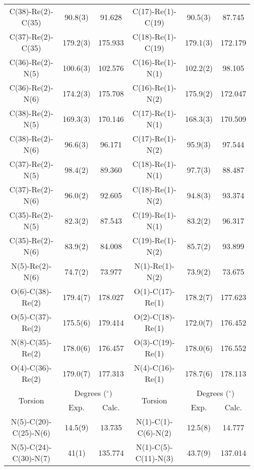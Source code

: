 \begin{table}[htbp]
{\begin{tabular}{cccccc}
    C(38)-Re(2)-C(35) & 90.8(3) & 91.628 & C(17)-Re(1)-C(19) & 90.5(3) & 87.745 \\
    C(37)-Re(2)-C(35) & 179.2(3) & 175.933 & C(18)-Re(1)-C(19) & 179.1(3) & 172.179 \\
    C(36)-Re(2)-N(5) & 100.6(3) & 102.576 & C(16)-Re(1)-N(1) & 102.2(2) & 98.105 \\
    C(36)-Re(2)-N(6) & 174.2(3) & 175.708 & C(16)-Re(1)-N(2) & 175.9(2) & 172.047 \\
    C(38)-Re(2)-N(5) & 169.3(3) & 170.146 & C(17)-Re(1)-N(1) & 168.3(3) & 170.509 \\
    C(38)-Re(2)-N(6) & 96.6(3) & 96.171 & C(17)-Re(1)-N(2) & 95.9(3) & 97.544 \\
    C(37)-Re(2)-N(5) & 98.4(2) & 89.360 & C(18)-Re(1)-N(1) & 97.7(3) & 88.487 \\
    C(37)-Re(2)-N(6) & 96.0(2) & 92.605 & C(18)-Re(1)-N(2) & 94.8(3) & 93.374 \\
    C(35)-Re(2)-N(5) & 82.3(2) & 87.543 & C(19)-Re(1)-N(1) & 83.2(2) & 96.317 \\
    C(35)-Re(2)-N(6) & 83.9(2) & 84.008 & C(19)-Re(1)-N(2) & 85.7(2) & 93.899 \\
    N(5)-Re(2)-N(6) & 74.7(2) & 73.977 & N(1)-Re(1)-N(2) & 73.9(2) & 73.675 \\
    O(6)-C(38)-Re(2) & 179.4(7) & 178.027 & O(1)-C(17)-Re(1) & 178.2(7) & 177.623 \\
    O(5)-C(37)-Re(2) & 175.5(6) & 179.414 & O(2)-C(18)-Re(1) & 172.0(7) & 176.452 \\ 
    N(8)-C(35)-Re(2) & 178.0(6) & 176.457 & O(3)-C(19)-Re(1) & 178.0(6) & 176.552 \\
    O(4)-C(36)-Re(2) & 179.0(7) & 177.313 & N(4)-C(16)-Re(1) & 178.7(6) & 178.113 \\ \midrule
    \multirow{2}{*}{Torsion} & \multicolumn{2}{c}{Degrees ($^\circ$)} & \multirow{2}{*}{Torsion} & \multicolumn{2}{c}{Degrees ($^\circ$)} \\ \cline{2-3} \cline {5-6}
     & Exp. & Calc. & & Exp. & Calc. \\ \midrule
    N(5)-C(20)-C(25)-N(6) & 14.5(9) & 13.735 & N(1)-C(1)-C(6)-N(2) & 12.5(8) & 14.777 \\
    N(5)-C(24)-C(30)-N(7) & 41(1) & 135.774 & N(1)-C(5)-C(11)-N(3) & 43.7(9) & 137.014 \\
    \bottomrule
    \end{tabular}}%
  \label{tab.da5}%
\end{table}%


